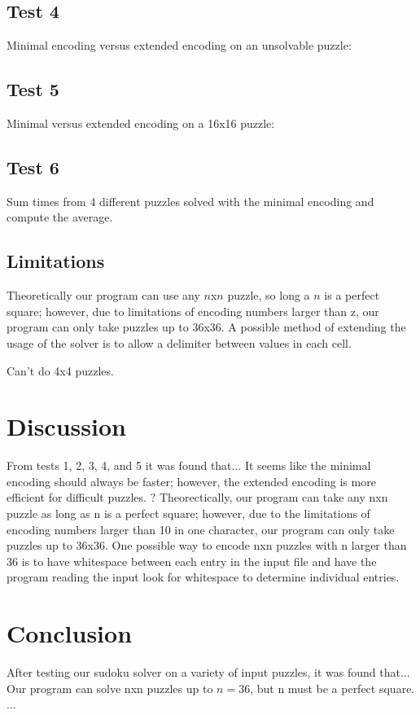 \documentclass[conference,draftclsnofoot]{IEEEtran}
\begin{document}
\subsection{Test 4}
Minimal encoding versus extended encoding on an unsolvable puzzle:

\subsection{Test 5}
Minimal versus extended encoding on a 16x16 puzzle:

\subsection{Test 6}
Sum times from 4 different puzzles solved with the minimal encoding and compute
the average.



\subsection{Limitations}
Theoretically our program can use any $n$x$n$ puzzle, so long a $n$ is a
perfect square; however, due to limitations of encoding numbers larger than z,
our program can only take puzzles up to 36x36. A possible method of extending
the usage of the solver is to allow a delimiter between values in each cell.


Can't do 4x4 puzzles.

\section{Discussion}
From tests 1, 2, 3, 4, and 5 it was found that...  It seems like the minimal
encoding should always be faster; however, the extended encoding is more
efficient for difficult puzzles. \(?\)
Theorectically, our program can take any nxn puzzle as long as n is a perfect
square; however, due to the limitations of encoding numbers larger than 10 in
one character, our program can only take puzzles up to 36x36. One possible way
to encode nxn puzzles with n larger than 36 is to have whitespace between each
entry in the input file and have the program reading the input look for
whitespace to determine individual entries.

\section{Conclusion}
After testing our sudoku solver on a variety of input puzzles, it was found
that...  Our program can solve nxn puzzles up to $n=36$, but n must be a
perfect square.  ...
\end{document}
